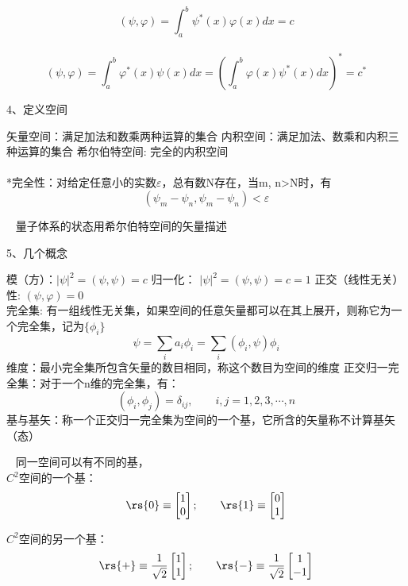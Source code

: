 \begin{frame} 
    \例 [2. 求定义在x空间的函数的内积]{}

    \解 ~ \[(\psi, \varphi)=\int_a ^b \psi^*(x)  \varphi(x) dx
    =c 
    \]
    ~ \[(\psi, \varphi)=\int_a ^b \varphi^*(x)\psi(x) dx = (\int_a ^b \varphi(x)\psi^*(x) dx) ^* =c^*\]
\end{frame} 

\begin{frame}
    4、定义空间\\
   \begin{itemize}
       \Item 矢量空间：满足加法和数乘两种运算的集合
       \Item 内积空间：满足加法、数乘和内积三种运算的集合
       \Item 希尔伯特空间:  完全的内积空间\\
       ~~ \\
       *完全性：对给定任意小的实数$\varepsilon$，总有数N存在，当m, n>N时，有\\
       $$ (\psi_m -\psi_n, \psi_m -\psi_n )< \varepsilon $$
   \end{itemize} 
   \Tips ~ 量子体系的状态用希尔伯特空间的矢量描述
\end{frame} 

\begin{frame}
    5、几个概念\\
   \begin{itemize}
       \Item 模（方）：$|\psi|^2= (\psi, \psi)=c$
       \Item 归一化： $|\psi|^2= (\psi, \psi)=c=1$
       \Item 正交（线性无关）性:  $(\psi, \varphi)=0 $ \\
       \Item 完全集: 有一组线性无关集，如果空间的任意矢量都可以在其上展开，则称它为一个完全集，记为$\{\phi_i\}$ 
       \[\psi=\sum_i a_i \phi_i= \sum_i (\phi_i,\psi) \phi_i\]
       \Item 维度：最小完全集所包含矢量的数目相同，称这个数目为空间的维度
       \Item 正交归一完全集：对于一个n维的完全集，有：\[(\phi_i,\phi_j)=\delta_{ij}, \qquad i,j=1,2,3,\cdots, n \]
       \Item 基与基矢：称一个正交归一完全集为空间的一个基，它所含的矢量称不计算基矢（态）
   \end{itemize} 
\end{frame} 

\begin{frame}
 \Tips~ 同一空间可以有不同的基，\\
 $C^2$空间的一个基：
 \[ \rs{0}\equiv\begin{bmatrix}
     1 \\
     0
 \end{bmatrix}; \qquad \rs{1}\equiv\begin{bmatrix}
    0 \\
    1
\end{bmatrix} \]

$C^2$空间的另一个基：
\[ \rs{+}\equiv\frac{1}{\sqrt{2}}\begin{bmatrix}
    1 \\
    1
\end{bmatrix}; \qquad \rs{-}\equiv\frac{1}{\sqrt{2}}\begin{bmatrix}
   1 \\
   -1
\end{bmatrix} \]

\end{frame} 

